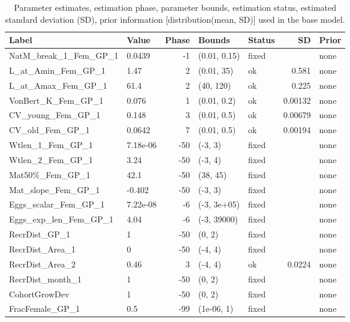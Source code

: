 \documentclass[
]{scrartcl}
\begin{document}
\begin{landscape}
\begingroup
\fontsize{9.0pt}{10.8pt}\selectfont

\begin{longtable}{llrllrl}

\caption{\label{tbl-pars}Parameter estimates, estimation phase,
parameter bounds, estimation status, estimated standard deviation (SD),
prior information {[}distribution(mean, SD){]} used in the base model.}

\tabularnewline

\toprule
Label & Value & Phase & Bounds & Status & SD & Prior \\ 
\midrule\addlinespace[2.5pt]
NatM\_break\_1\_Fem\_GP\_1 & 0.0439 & -1 & (0.01, 0.15) & fixed &  & none \\ 
L\_at\_Amin\_Fem\_GP\_1 & 1.47 & 2 & (0.01, 35) & ok & 0.581 & none \\ 
L\_at\_Amax\_Fem\_GP\_1 & 61.4 & 2 & (40, 120) & ok & 0.225 & none \\ 
VonBert\_K\_Fem\_GP\_1 & 0.076 & 1 & (0.01, 0.2) & ok & 0.00132 & none \\ 
CV\_young\_Fem\_GP\_1 & 0.148 & 3 & (0.01, 0.5) & ok & 0.00679 & none \\ 
CV\_old\_Fem\_GP\_1 & 0.0642 & 7 & (0.01, 0.5) & ok & 0.00194 & none \\ 
Wtlen\_1\_Fem\_GP\_1 & 7.18e-06 & -50 & (-3, 3) & fixed &  & none \\ 
Wtlen\_2\_Fem\_GP\_1 & 3.24 & -50 & (-3, 4) & fixed &  & none \\ 
Mat50\%\_Fem\_GP\_1 & 42.1 & -50 & (38, 45) & fixed &  & none \\ 
Mat\_slope\_Fem\_GP\_1 & -0.402 & -50 & (-3, 3) & fixed &  & none \\ 
Eggs\_scalar\_Fem\_GP\_1 & 7.22e-08 & -6 & (-3, 3e+05) & fixed &  & none \\ 
Eggs\_exp\_len\_Fem\_GP\_1 & 4.04 & -6 & (-3, 39000) & fixed &  & none \\ 
RecrDist\_GP\_1 & 1 & -50 & (0, 2) & fixed &  & none \\ 
RecrDist\_Area\_1 & 0 & -50 & (-4, 4) & fixed &  & none \\ 
RecrDist\_Area\_2 & 0.46 & 3 & (-4, 4) & ok & 0.0224 & none \\ 
RecrDist\_month\_1 & 1 & -50 & (0, 2) & fixed &  & none \\ 
CohortGrowDev & 1 & -50 & (0, 2) & fixed &  & none \\ 
FracFemale\_GP\_1 & 0.5 & -99 & (1e-06, 1) & fixed &  & none \\ 

\end{longtable}
\end{landscape}
\end{document}
